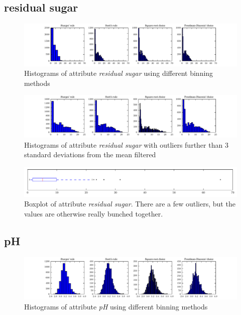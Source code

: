 \documentclass{report}
\begin{document}
\newpage
\subsection{residual sugar}
\begin{figure}[H]
\includegraphics[width=\textwidth]{histograms/residual_sugar.pdf}
\caption{Histograms of attribute \emph{residual sugar} using different binning methods}\end{figure}

\begin{figure}[H]
\includegraphics[width=\textwidth]{histograms/residual_sugar_filtered.pdf}
\caption{Histograms of attribute \emph{residual sugar} with outliers further than 3 standard deviations from the mean filtered}
\end{figure}

\begin{figure}[H]
\includegraphics[width=\textwidth]{boxplots/residual_sugar.pdf}
\caption{Boxplot of attribute \emph{residual sugar}. There are a few outliers, but the values are otherwise really bunched together.}\end{figure}

\newpage
\subsection{pH}
\begin{figure}[H]
\includegraphics[width=\textwidth]{histograms/pH.pdf}
\caption{Histograms of attribute \emph{pH} using different binning methods}\end{figure}
\end{document}
